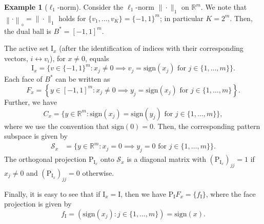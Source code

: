 \documentclass[12pt]{amsart}
\numberwithin{equation}{section}
\numberwithin{equation}{section}
\theoremstyle{definition}
\newtheorem{example}[thm]{Example}
\newcommand{\R}{\mathbb{R}}
\newcommand{\I}{\mathrm{I}}
\newcommand{\poly}[1]{\left\|#1\right\|_\diamond}
\newcommand{\PP}{\mathrm{P}}
\renewcommand{\SS}{\mathcal{S}}
\begin{document}
\begin{example}[$\ell_1$-norm]\label{ex:l1}
Consider the $\ell_1$-norm $\|\cdot\|_1$ on $\R^m$. We note that $\poly{\cdot}=\|\cdot\|_1$ holds for $\{v_1,\ldots,v_K\}=\{-1,1\}^m$; in particular $K=2^m$.
Then, the dual ball is $B^\ast=[-1,1]^m$. 

The active set  $\I_x$ (after the identification of indices with their corresponding vectors, $i\leftrightarrow v_i$), for $x\neq 0$, equals 
\[
\I_x = \{v\in\{-1,1\}^m\colon x_j\neq 0 \implies v_j=\mathrm{sign}(x_j)\mbox{ for }j\in\{1,\ldots,m\}\}.
\]
Each face of $B^\ast$ can be written as 
\[
F_{x} =\left\{ y\in[-1,1]^m\colon x_j\neq0\implies y_j = \mathrm{sign}(x_j)\mbox{ for }j\in\{1,\ldots,m\}\right\}.
\]
Further, we have 
\[
C_x = \{y\in\R^m\colon \mathrm{sign}(x_j)=\mathrm{sign}(y_j)\mbox{ for }j\in\{1,\ldots,m\}\},
\]
where we use the convention that $\mathrm{sign}(0)=0$. 
Then, the corresponding pattern subspace is given by 
\begin{align*}
\mathcal{S}_{x} &=\{y\in\R^m\colon x_j=0 \implies y_j=0\mbox{ for }j\in\{1,\ldots,m\}\}.
\end{align*}
The orthogonal projection $\PP_{\I_x}$ onto $\SS_{x}$ is a diagonal matrix with $(\PP_{\I_x})_{jj} = 1$ if $x_j\neq 0$ and $(\PP_{\I_x})_{jj} = 0$ otherwise. 

Finally, it is easy to see that if $\I_x=\I$, then we have $\PP_{\I} F_x = \{f_{\I}\}$, where the face projection is given by
\[
f_{\I}  = (\mathrm{sign}(x_j)\colon j\in\{1,\ldots,m\}) = \mathrm{sign}(x).
\]
\end{example}
\end{document}
